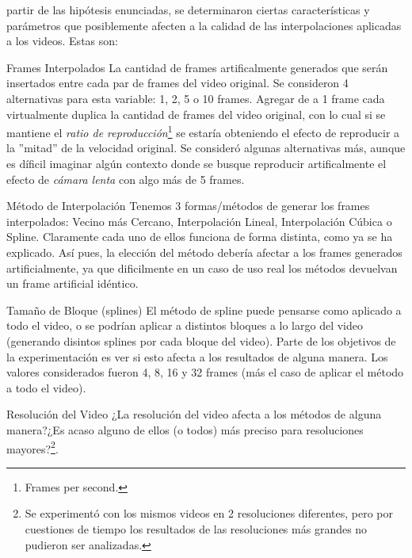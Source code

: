  partir de las hip\'otesis enunciadas, se determinaron
ciertas caracter\'isticas y par\'ametros que posiblemente afecten a la calidad
de las interpolaciones aplicadas a los videos. Estas son:

\begin{LaTeXdescription}
    \item[Frames Interpolados] La cantidad de frames artificalmente generados
        que ser\'an insertados entre cada par de frames del video original. Se
        consideron 4 alternativas para esta variable: 1, 2, 5 o 10 frames.
        Agregar de a 1 frame cada virtualmente duplica la cantidad de frames
        del video original, con lo cual si se mantiene el \emph{ratio de
        reproducci\'on}\footnote{Frames per second.} se estar\'ia obteniendo el
        efecto de reproducir a la ''mitad'' de la velocidad original. Se
        consider\'o algunas alternativas m\'as, aunque es d\'ificil imaginar
        alg\'un contexto donde se busque reproducir artificalmente el efecto de
        \emph{c\'amara lenta} con algo m\'as de 5 frames.\medskip

    \item[M\'etodo de Interpolaci\'on] Tenemos 3 formas/m\'etodos de generar
        los frames interpolados: Vecino m\'as Cercano, Interpolaci\'on Lineal,
        Interpolaci\'on C\'ubica o Spline. Claramente cada uno de ellos funciona
        de forma distinta, como ya se ha explicado. As\'i pues, la elecci\'on
        del m\'etodo deber\'ia afectar a los frames generados artificialmente,
        ya que dificilmente en un caso de uso real los m\'etodos devuelvan un
        frame artificial id\'entico.\medskip

    \item[Tama\~no de Bloque (splines)] El m\'etodo de spline puede pensarse
        como aplicado a todo el video, o se podr\'ian aplicar a distintos
        bloques a lo largo del video (generando disintos splines por cada
        bloque del video).  Parte de los objetivos de la experimentaci\'on es
        ver si esto afecta a los resultados de alguna manera. Los valores
        considerados fueron 4, 8, 16 y 32 frames (m\'as el caso de aplicar el
        m\'etodo a todo el video).\medskip

    \item[Resoluci\'on del Video] ¿La resoluci\'on del video afecta a los
        m\'etodos de alguna manera?¿Es acaso alguno de ellos (o todos) m\'as
        preciso para resoluciones mayores?\footnote{Se experiment\'o con los
        mismos videos en 2 resoluciones diferentes, pero por cuestiones de
        tiempo los resultados de las resoluciones m\'as grandes no pudieron ser
        analizadas.}.\medskip


\end{LaTeXdescription}
